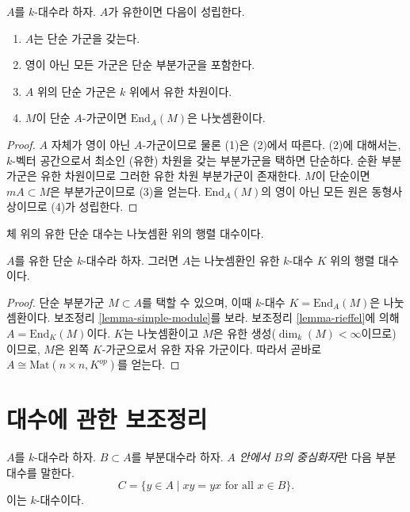 \begin{lemma}
\label{lemma-simple-module}
$A$를 $k$-대수라 하자. $A$가 유한이면 다음이 성립한다.
\begin{enumerate}
\item $A$는 단순 가군을 갖는다.
\item 영이 아닌 모든 가군은 단순 부분가군을 포함한다.
\item $A$ 위의 단순 가군은 $k$ 위에서 유한 차원이다.
\item $M$이 단순 $A$-가군이면 $\text{End}_A(M)$은 나눗셈환이다.
\end{enumerate}
\end{lemma}

\begin{proof}
$A$ 자체가 영이 아닌 $A$-가군이므로 물론 (1)은 (2)에서 따른다.
(2)에 대해서는, $k$-벡터 공간으로서 최소인 (유한) 차원을 갖는
부분가군을 택하면 단순하다. 순환 부분가군은 유한 차원이므로 그러한
유한 차원 부분가군이 존재한다. $M$이 단순이면 $mA \subset M$은
부분가군이므로 (3)을 얻는다. $\text{End}_A(M)$의 영이 아닌 모든 원은
동형사상이므로 (4)가 성립한다.
\end{proof}

\begin{theorem}
\label{theorem-wedderburn}
\begin{slogan}
체 위의 유한 단순 대수는 나눗셈환 위의 행렬 대수이다.
\end{slogan}
$A$를 유한 단순 $k$-대수라 하자. 그러면 $A$는 나눗셈환인 유한
$k$-대수 $K$ 위의 행렬 대수이다.
\end{theorem}

\begin{proof}
단순 부분가군 $M \subset A$를 택할 수 있으며, 이때
$k$-대수 $K = \text{End}_A(M)$은 나눗셈환이다. 보조정리
\ref{lemma-simple-module}를 보라.
보조정리 \ref{lemma-rieffel}에 의해
$A = \text{End}_K(M)$이다. $K$는 나눗셈환이고
$M$은 유한 생성($\dim_k(M) < \infty$이므로)이므로, $M$은 왼쪽
$K$-가군으로서 유한 자유 가군이다. 따라서 곧바로
$A \cong \text{Mat}(n \times n, K^{op})$를 얻는다.
\end{proof}


\section{대수에 관한 보조정리}
\label{section-lemmas}

\noindent
$A$를 $k$-대수라 하자. $B \subset A$를 부분대수라 하자.
{\it $A$ 안에서 $B$의 중심화자}란 다음 부분대수를 말한다.
$$
C  = \{y \in A \mid xy = yx \text{ for all }x \in B\}.
$$
이는 $k$-대수이다.

